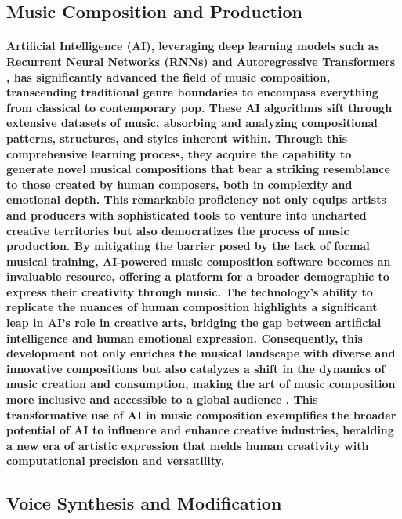 \documentclass[11pt,a4paper,oneside]{report}
\begin{document}
\subsection{Music Composition and Production}
\paragraph{Artificial Intelligence (AI), leveraging deep learning models such as Recurrent Neural Networks (RNNs) \cite{srivastava2015unsupervised} \cite{chiappa2017recurrent} \cite{ha2018world} and Autoregressive Transformers \cite{yan2021videogpt} \cite{wu2022nuwa}, has significantly advanced the field of music composition, transcending traditional genre boundaries to encompass everything from classical to contemporary pop. These AI algorithms sift through extensive datasets of music, absorbing and analyzing compositional patterns, structures, and styles inherent within. Through this comprehensive learning process, they acquire the capability to generate novel musical compositions that bear a striking resemblance to those created by human composers, both in complexity and emotional depth. This remarkable proficiency not only equips artists and producers with sophisticated tools to venture into uncharted creative territories but also democratizes the process of music production. By mitigating the barrier posed by the lack of formal musical training, AI-powered music composition software becomes an invaluable resource, offering a platform for a broader demographic to express their creativity through music. The technology's ability to replicate the nuances of human composition highlights a significant leap in AI's role in creative arts, bridging the gap between artificial intelligence and human emotional expression. Consequently, this development not only enriches the musical landscape with diverse and innovative compositions but also catalyzes a shift in the dynamics of music creation and consumption, making the art of music composition more inclusive and accessible to a global audience \cite{briot2021artificial}. This transformative use of AI in music composition exemplifies the broader potential of AI to influence and enhance creative industries, heralding a new era of artistic expression that melds human creativity with computational precision and versatility.}

\subsection{Voice Synthesis and Modification}
\end{document}

